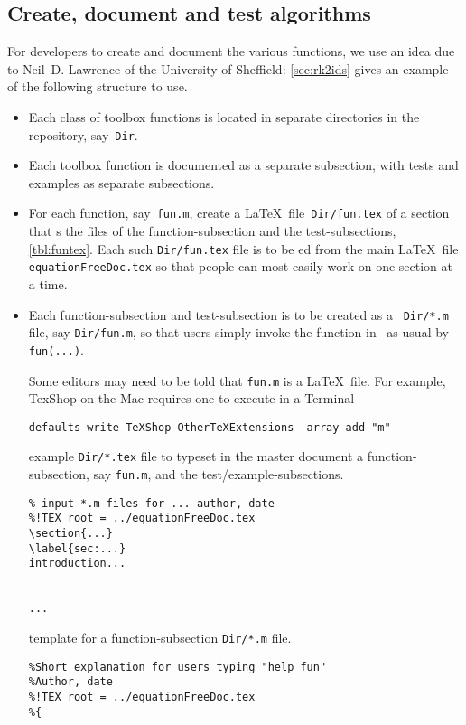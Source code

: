 \subsection{Create, document and test algorithms}

For developers to create and document the various functions, we use an idea due to Neil~D. Lawrence of the University of Sheffield:
\autoref{sec:rk2ids} gives an example of the following structure to use.

\begin{itemize}
\item Each class of toolbox functions is located in separate directories in the repository, say~\verb|Dir|.

\item Each toolbox function is documented as a separate subsection, with tests and examples as separate subsections.

\item For each function, say~\verb|fun.m|, create a \LaTeX\ file~\verb|Dir/fun.tex| of a section that \verb||s the  files of the function-subsection and the test-subsections, \autoref{tbl:funtex}.
Each such \verb|Dir/fun.tex| file is to be \verb||ed from the main \LaTeX\ file \verb|equationFreeDoc.tex| so that people can most easily work on one section at a time.  

\item Each function-subsection and test-subsection is to be created as a \script\ \verb|Dir/*.m| file, say \verb|Dir/fun.m|, so that users simply invoke the function in \script\ as usual by \verb|fun(...)|.

Some editors may need to be told that \verb|fun.m| is a \LaTeX\ file.  For example, TexShop on the Mac requires one to execute in a Terminal
\begin{verbatim}
defaults write TeXShop OtherTeXExtensions -array-add "m"
\end{verbatim}

\begin{table}
\caption{\label{tbl:funtex}example \texttt{Dir/*.tex} file to typeset in the master document a function-subsection, say \texttt{fun.m}, and the test\slash example-subsections.}
\begin{verbatim}
% input *.m files for ... author, date
%!TEX root = ../equationFreeDoc.tex
\section{...}
\label{sec:...}
introduction...


...
\end{verbatim}
\hrulefill
\caption{\label{tbl:format}template for a function-subsection \texttt{Dir/*.m} file.}
\begin{verbatim}
%Short explanation for users typing "help fun"
%Author, date
%!TEX root = ../equationFreeDoc.tex
%{

\end{verbatim}
\end{table}
\end{itemize}
